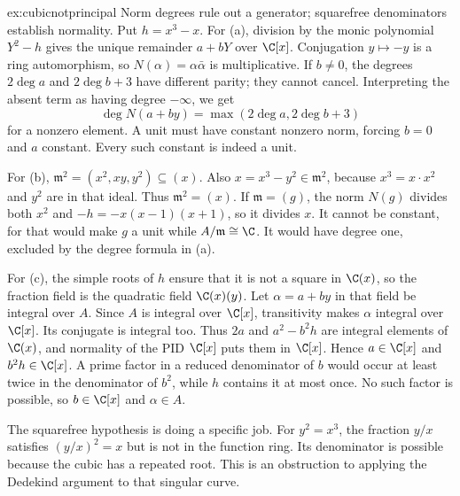 \begin{solution}{ex:cubicnotprincipal}
\idea Norm degrees rule out a generator; squarefree denominators establish normality.
\writeup Put $h=x^3-x$. For (a), division by the monic polynomial $Y^2-h$ gives the unique remainder $a+bY$ over $\C[x]$. Conjugation $y\mapsto-y$ is a ring automorphism, so $N(\alpha)=\alpha\bar\alpha$ is multiplicative. If $b\ne0$, the degrees $2\deg a$ and $2\deg b+3$ have different parity; they cannot cancel. Interpreting the absent term as having degree $-\infty$, we get
\[
 \deg N(a+by)=\max(2\deg a,2\deg b+3)
\]
for a nonzero element. A unit must have constant nonzero norm, forcing $b=0$ and $a$ constant. Every such constant is indeed a unit.

For (b), $\mathfrak m^2=(x^2,xy,y^2)\subseteq(x)$. Also $x=x^3-y^2\in\mathfrak m^2$, because $x^3=x\cdot x^2$ and $y^2$ are in that ideal. Thus $\mathfrak m^2=(x)$. If $\mathfrak m=(g)$, the norm $N(g)$ divides both $x^2$ and $-h=-x(x-1)(x+1)$, so it divides $x$. It cannot be constant, for that would make $g$ a unit while $A/\mathfrak m\cong\C$. It would have degree one, excluded by the degree formula in (a).

For (c), the simple roots of $h$ ensure that it is not a square in $\C(x)$, so the fraction field is the quadratic field $\C(x)(y)$. Let $\alpha=a+by$ in that field be integral over $A$. Since $A$ is integral over $\C[x]$, transitivity makes $\alpha$ integral over $\C[x]$. Its conjugate is integral too. Thus $2a$ and $a^2-b^2h$ are integral elements of $\C(x)$, and normality of the PID $\C[x]$ puts them in $\C[x]$. Hence $a\in\C[x]$ and $b^2h\in\C[x]$. A prime factor in a reduced denominator of $b$ would occur at least twice in the denominator of $b^2$, while $h$ contains it at most once. No such factor is possible, so $b\in\C[x]$ and $\alpha\in A$.

The squarefree hypothesis is doing a specific job. For $y^2=x^3$, the fraction $y/x$ satisfies $(y/x)^2=x$ but is not in the function ring. Its denominator is possible because the cubic has a repeated root. This is an obstruction to applying the Dedekind argument to that singular curve.
\end{solution}

